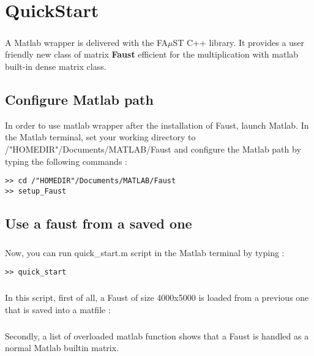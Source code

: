 \chapter{QuickStart}\label{sec:firstUse}


\paragraph{}A Matlab wrapper is delivered with the FA$\mu$ST C++ library.
It provides a user friendly new class of matrix \textbf{Faust} efficient for the multiplication with matlab built-in dense matrix class.\newline

\section{Configure Matlab path}\label{sec:firstUseMatlabPath}
In order to use matlab wrapper after the installation of Faust, launch Matlab.
In the Matlab terminal, set your working directory to /"HOMEDIR"/Documents/MATLAB/Faust and configure the Matlab path by typing the following commands :

\begin{lstlisting}
>> cd /"HOMEDIR"/Documents/MATLAB/Faust
>> setup_Faust
\end{lstlisting}



\section{Use a faust from a saved one}\label{sec:firstUseBuildFromSave}
\paragraph{} Now, you can run quick\_start.m script in the Matlab terminal by typing :
\begin{lstlisting}
>> quick_start
\end{lstlisting}
\paragraph{}In this script, first of all, a Faust of size 4000x5000 is loaded from a previous one that is saved into a matfile :

\newpage
\paragraph{}Secondly, a list of overloaded matlab function shows that a Faust is handled as a normal Matlab builtin matrix.
 
